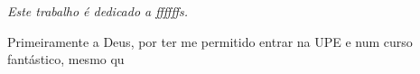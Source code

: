 \begin{dedicatoria}
   \vspace*{\fill}
   \centering
   \noindent
   \textit{ Este trabalho é dedicado a ffffffs.} \vspace*{\fill}
\end{dedicatoria}

\begin{agradecimentos}
Primeiramente a Deus, por ter me permitido entrar na UPE e num curso fantásti\-co, mesmo qu

\end{agradecimentos}